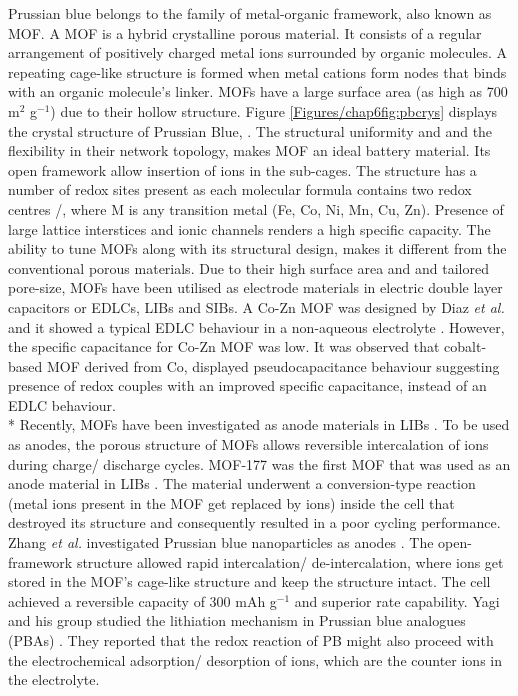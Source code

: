 Prussian blue belongs to the family of metal-organic framework, also known as MOF. A MOF is a hybrid crystalline porous material. It consists of a regular arrangement of positively charged metal ions surrounded by organic molecules. A repeating cage-like structure is formed when metal cations form nodes that binds with an organic molecule's linker. MOFs have a large surface area (as high as 700 m$^{2}$ g$^{-1}$) due to their hollow structure. Figure \ref{Figures/chap6fig:pbcrys} displays the crystal structure of Prussian Blue, . The structural uniformity and and the flexibility in their network topology, makes MOF an ideal battery material. Its open framework allow insertion of ions in the sub-cages. The structure has a number of redox sites present as each molecular formula contains two redox centres /, where M is any transition metal (Fe, Co, Ni, Mn, Cu, Zn). Presence of large lattice interstices and ionic channels renders a high specific capacity. The ability to tune MOFs along with its structural design, makes it different from the conventional porous materials. Due to their high surface area and and tailored pore-size, MOFs have been utilised as electrode materials in electric double layer capacitors or EDLCs, LIBs and SIBs. A Co-Zn MOF was designed by Diaz \textit{et al.} and it showed a typical EDLC behaviour in a non-aqueous electrolyte \cite{diaz_co8-mof-5_2012}. However, the specific capacitance for Co-Zn MOF was low. It was observed that cobalt-based MOF derived from Co, displayed pseudocapacitance behaviour suggesting presence of redox couples with an improved specific capacitance, instead of an EDLC behaviour. \\*
Recently, MOFs have been investigated as anode materials in LIBs \cite{li_shape-controlled_2006, han_synthesis_2012, zhao_metalorganic_2015}. To be used as anodes, the porous structure of MOFs allows reversible intercalation of  ions during charge/ discharge cycles. MOF-177 was the first MOF that was used as an anode material in LIBs \cite{li_shape-controlled_2006}. The material underwent a conversion-type reaction (metal ions present in the MOF get replaced by  ions) inside the cell that destroyed its structure and consequently resulted in a poor cycling performance. Zhang \textit{et al.} investigated Prussian blue nanoparticles as anodes \cite{nie_prussian_2014}. The open-framework structure allowed rapid intercalation/ de-intercalation, where  ions get stored in the MOF's cage-like structure and keep the structure intact. The cell achieved a reversible capacity of 300 mAh g$^{-1}$ and superior rate capability. Yagi and his group studied the lithiation mechanism in Prussian blue analogues (PBAs) \cite{yagi_eqcm_2014}. They reported that the redox reaction of PB might also proceed with the electrochemical adsorption/ desorption of  ions, which are the counter ions in the electrolyte. 
